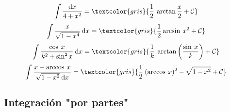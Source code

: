 {\begin{fleqn}
\begin{equation}
	\end{equation}
	\begin{equation}
		\int \frac{\mathrm{d}x}{4+x^2}=\textcolor{gris}{\frac 1 2 \: \arctan\frac x 2 +\mathcal C}
	\end{equation}
	\begin{equation}
		\int\frac{x}{\sqrt{1-x^4}}\: \mathrm{d}x=\textcolor{gris}{\frac 1 2 \arcsin\: x^2 + \mathcal C}
	\end{equation}
	\begin{equation}
		\int \frac{\cos\: x}{k^2+\sin^2x}\: \mathrm{d}x=\textcolor{gris}{\frac 1 k\:  \arctan \left( \frac {\sin\: x}{k} \right)+\mathcal C}
	\end{equation}
	\begin{equation}
		\int \frac{x-\arccos\: x}{\sqrt{1-x^2}\: \mathrm{d}x}=\textcolor{gris}{\frac 1 2 \: (\arccos\: x)^2-\sqrt{1-x^2}+\mathcal C}
	\end{equation}
	
	\subsection*{Integración "por partes"}
	

\end{fleqn}}
